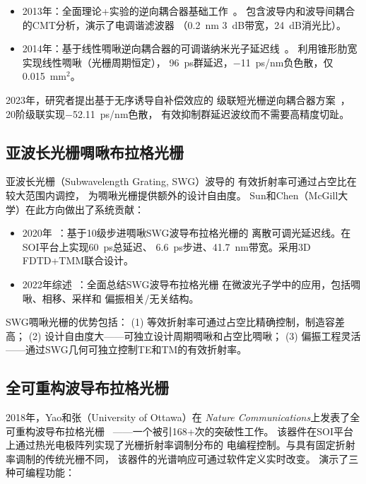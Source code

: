 \documentclass[12pt,a4paper,twoside]{article}
\begin{document}
\begin{itemize}[leftmargin=*,itemsep=2pt]
\item 2013年：全面理论+实验的逆向耦合器基础工作~\cite{shi2013}。
  包含波导内和波导间耦合的CMT分析，演示了电调谐滤波器
  （0.2~nm 3~dB带宽，24~dB消光比）。
\item 2014年：基于线性啁啾逆向耦合器的可调谐纳米光子延迟线~\cite{shi2014}。
  利用锥形肋宽实现线性啁啾（光栅周期恒定），
  96~ps群延迟，$-$11~ps/nm负色散，仅0.015~mm$^2$。
\end{itemize}

2023年，研究者提出基于无序诱导自补偿效应的
级联短光栅逆向耦合器方案~\cite{cascaded2023}，
20阶级联实现$-$52.11~ps/nm色散，
有效抑制群延迟波纹而不需要高精度切趾。

\subsection{亚波长光栅啁啾布拉格光栅}

亚波长光栅（Subwavelength Grating, SWG）波导的
有效折射率可通过占空比在较大范围内调控，
为啁啾光栅提供额外的设计自由度。
Sun和Chen（McGill大学）在此方向做出了系统贡献：

\begin{itemize}[leftmargin=*,itemsep=2pt]
\item 2020年~\cite{sun2020jlt}：基于10级步进啁啾SWG波导布拉格光栅的
  离散可调光延迟线。在SOI平台上实现60~ps总延迟、
  6.6~ps步进、41.7~nm带宽。采用3D FDTD+TMM联合设计。
\item 2022年综述~\cite{sun2022}：全面总结SWG波导布拉格光栅
  在微波光子学中的应用，包括啁啾、相移、采样和
  偏振相关/无关结构。
\end{itemize}

SWG啁啾光栅的优势包括：
(1) 等效折射率可通过占空比精确控制，制造容差高；
(2) 设计自由度大——可独立设计周期啁啾和占空比啁啾；
(3) 偏振工程灵活——通过SWG几何可独立控制TE和TM的有效折射率。

\subsection{全可重构波导布拉格光栅}

2018年，Yao和张（University of Ottawa）在
\textit{Nature Communications}上发表了全可重构波导布拉格光栅
~\cite{zhang2018}——一个被引168+次的突破性工作。
该器件在SOI平台上通过热光电极阵列实现了光栅折射率调制分布的
电编程控制。与具有固定折射率调制的传统光栅不同，
该器件的光谱响应可通过软件定义实时改变。
演示了三种可编程功能：
\end{document}
